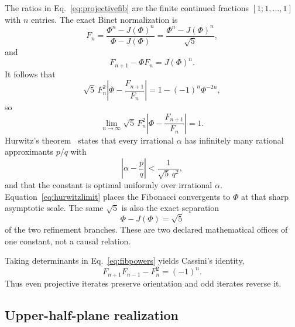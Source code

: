\documentclass[10pt,oneside]{article}
\theoremstyle{plaincompact}
\theoremstyle{definitioncompact}
\newcommand{\Fib}{F}
\begin{document}
The ratios in Eq.~\eqref{eq:projectivefib} are the finite continued fractions
$[1;1,\ldots,1]$ with $n$ entries.  The exact Binet normalization is
\begin{equation}\label{eq:binet}
\Fib_n=\frac{\Phi^n-J(\Phi)^n}{\Phi-J(\Phi)}
=\frac{\Phi^n-J(\Phi)^n}{\sqrt5},
\end{equation}
and
\begin{equation}\label{eq:exacterror}
\Fib_{n+1}-\Phi\Fib_n=J(\Phi)^n.
\end{equation}
It follows that
\begin{equation}\label{eq:scalederror}
\sqrt5\,\Fib_n^2
\left|\Phi-\frac{\Fib_{n+1}}{\Fib_n}\right|
=1-(-1)^n\Phi^{-2n},
\end{equation}
so
\begin{equation}\label{eq:hurwitzlimit}
\lim_{n\to\infty}\sqrt5\,\Fib_n^2
\left|\Phi-\frac{\Fib_{n+1}}{\Fib_n}\right|=1.
\end{equation}
Hurwitz's theorem~\cite{HardyWright,Khinchin} states that every irrational
$\alpha$ has infinitely many
rational approximants $p/q$ with
\begin{equation}\label{eq:hurwitz}
\left|\alpha-\frac pq\right|<\frac1{\sqrt5\,q^2},
\end{equation}
and that the constant is optimal uniformly over irrational $\alpha$.
Equation~\eqref{eq:hurwitzlimit} places the Fibonacci convergents to $\Phi$ at
that sharp asymptotic scale.  The same $\sqrt5$ is also the exact separation
\begin{equation}\label{eq:rootgap}
\Phi-J(\Phi)=\sqrt5
\end{equation}
of the two refinement branches.  These are two declared mathematical offices
of one constant, not a causal relation.

Taking determinants in Eq.~\eqref{eq:fibpowers} yields Cassini's identity,
\begin{equation}\label{eq:cassini}
\Fib_{n+1}\Fib_{n-1}-\Fib_n^2=(-1)^n.
\end{equation}
Thus even projective iterates preserve orientation and odd iterates reverse it.

\subsection{Upper-half-plane realization}
\end{document}
